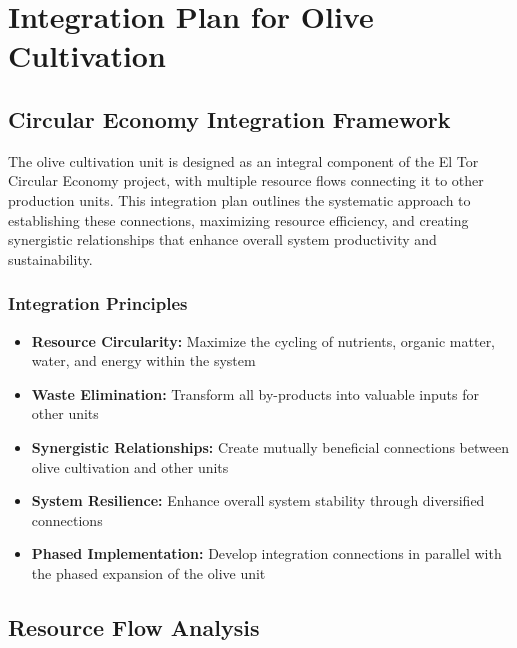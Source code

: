 \section{Integration Plan for Olive Cultivation}

\subsection{Circular Economy Integration Framework}

The olive cultivation unit is designed as an integral component of the El Tor Circular Economy project, with multiple resource flows connecting it to other production units. This integration plan outlines the systematic approach to establishing these connections, maximizing resource efficiency, and creating synergistic relationships that enhance overall system productivity and sustainability.

\subsubsection{Integration Principles}
\begin{itemize}
    \item \textbf{Resource Circularity:} Maximize the cycling of nutrients, organic matter, water, and energy within the system
    \item \textbf{Waste Elimination:} Transform all by-products into valuable inputs for other units
    \item \textbf{Synergistic Relationships:} Create mutually beneficial connections between olive cultivation and other units
    \item \textbf{System Resilience:} Enhance overall system stability through diversified connections
    \item \textbf{Phased Implementation:} Develop integration connections in parallel with the phased expansion of the olive unit
\end{itemize}

\subsection{Resource Flow Analysis}

